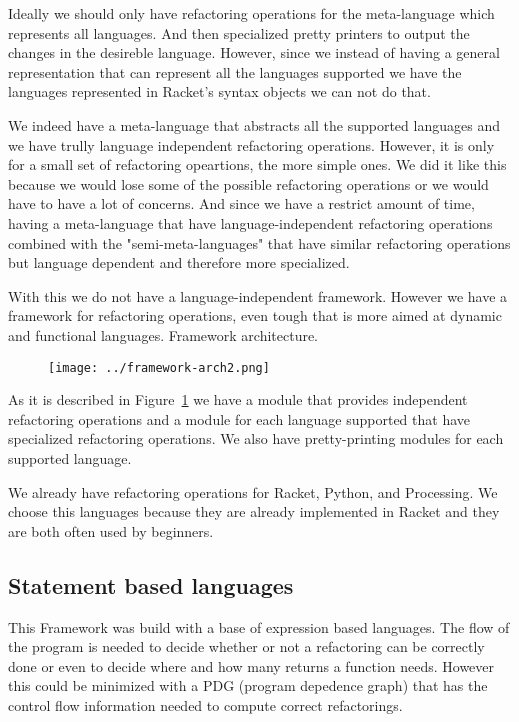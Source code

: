 Ideally we should only have refactoring operations for the meta-language which represents
all languages. And then specialized pretty printers to output the changes in the
desireble language.
However, since we instead of having a general representation that can represent all the languages
supported we have the languages represented in Racket's syntax objects we can not do that.

We indeed have a meta-language that abstracts all the supported languages and
we have trully language independent refactoring operations. However, it is only
for a small set of refactoring opeartions, the more simple ones. We did it like
this because we would lose some of the possible refactoring operations or we would
have to have a lot of concerns. And since we have a restrict amount of time, having
a meta-language that have language-independent refactoring operations combined
with the "semi-meta-languages" that have similar refactoring operations but
language dependent and therefore more specialized.

With this we do not have a language-independent framework. However we have a framework
for refactoring operations, even tough that is more aimed at dynamic and functional languages.
Framework architecture.%
\begin{figure}[h]
\texttt{[image: ../framework-arch2.png]}
\label{fig:framework}
\end{figure}

As it is described in Figure~\ref{fig:framework} we have a module that provides
independent refactoring operations and a module for each language supported that
have specialized refactoring operations. We also have pretty-printing modules for
each supported language.

We already have refactoring operations for Racket, Python, and Processing. We choose
this languages because they are already implemented in Racket and they are both
often used by beginners.


\subsection{Statement based languages}
This Framework was build with a base of expression based languages. The flow of
the program is needed to decide whether or not a refactoring can be correctly done
or even to decide where and how many returns a function needs. However this could
be minimized with a PDG (program depedence graph) that has the control flow information
needed to compute correct refactorings.

